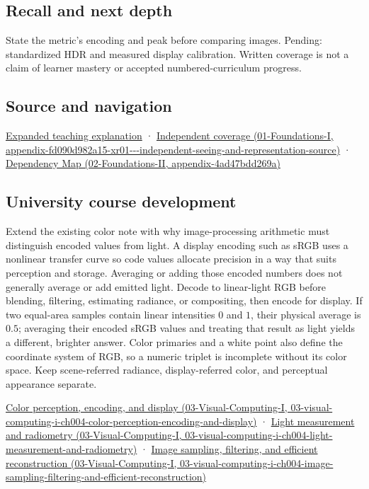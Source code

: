 \subsection{Recall and next depth}\label{appendix-a9f83ad40792-recall-and-next-depth}

State the metric's encoding and peak before comparing images. Pending: standardized HDR and measured display calibration. Written coverage is not a claim of learner mastery or accepted numbered-curriculum progress.

\subsection{Source and navigation}\label{appendix-a9f83ad40792-source-and-navigation}

\hyperref[04-visual-computing-ii-ch042-encoded-rgb-must-not-masquerade-as-linear-light]{Expanded teaching explanation} · \href{../01-Foundations-I/main.pdf\#nameddest=appendix-fd090d982a15-xr01---independent-seeing-and-representation-source}{Independent coverage (01-Foundations-I, appendix-fd090d982a15-xr01-\/-\/-independent-seeing-and-representation-source)} · \href{../02-Foundations-II/main.pdf\#nameddest=appendix-4ad47bdd269a}{Dependency Map (02-Foundations-II, appendix-4ad47bdd269a)}

\subsection{University course development}\label{appendix-a9f83ad40792-university-course-development}

Extend the existing color note with why image-processing arithmetic must distinguish encoded values from light. A display encoding such as sRGB uses a nonlinear transfer curve so code values allocate precision in a way that suits perception and storage. Averaging or adding those encoded numbers does not generally average or add emitted light. Decode to linear-light RGB before blending, filtering, estimating radiance, or compositing, then encode for display. If two equal-area samples contain linear intensities \(0\) and \(1\), their physical average is \(0.5\); averaging their encoded sRGB values and treating that result as light yields a different, brighter answer. Color primaries and a white point also define the coordinate system of RGB, so a numeric triplet is incomplete without its color space. Keep scene-referred radiance, display-referred color, and perceptual appearance separate.

\href{../03-Visual-Computing-I/main.pdf\#nameddest=03-visual-computing-i-ch004-color-perception-encoding-and-display}{Color perception, encoding, and display (03-Visual-Computing-I, 03-visual-computing-i-ch004-color-perception-encoding-and-display)} · \href{../03-Visual-Computing-I/main.pdf\#nameddest=03-visual-computing-i-ch004-light-measurement-and-radiometry}{Light measurement and radiometry (03-Visual-Computing-I, 03-visual-computing-i-ch004-light-measurement-and-radiometry)} · \href{../03-Visual-Computing-I/main.pdf\#nameddest=03-visual-computing-i-ch004-image-sampling-filtering-and-efficient-reconstruction}{Image sampling, filtering, and efficient reconstruction (03-Visual-Computing-I, 03-visual-computing-i-ch004-image-sampling-filtering-and-efficient-reconstruction)}

